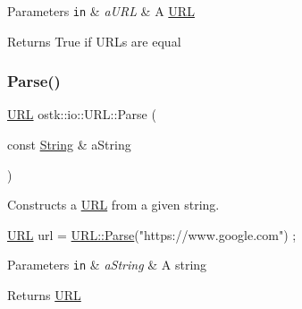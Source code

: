 \begin{DoxyParams}[1]{Parameters}
\mbox{\tt in}  & {\em a\+U\+RL} & A \hyperlink{classostk_1_1io_1_1_u_r_l}{U\+RL} \\
\hline
\end{DoxyParams}
\begin{DoxyReturn}{Returns}
True if U\+R\+Ls are equal 
\end{DoxyReturn}
\mbox{\label{classostk_1_1io_1_1_u_r_l_a1cd7216bb1079f62386a218ba510958d}} 
\subsubsection{\texorpdfstring{Parse()}{Parse()}}
{\footnotesize\ttfamily \hyperlink{classostk_1_1io_1_1_u_r_l}{U\+RL} ostk\+::io\+::\+U\+R\+L\+::\+Parse (\begin{DoxyParamCaption}\item[{const \hyperlink{namespaceostk_1_1io_a95d49b120613a7610cb1b4f03b1116b6}{String} \&}]{a\+String }\end{DoxyParamCaption})\hspace{0.3cm}{\ttfamily [static]}}



Constructs a \hyperlink{classostk_1_1io_1_1_u_r_l}{U\+RL} from a given string. 


\begin{DoxyCode}
\hyperlink{classostk_1_1io_1_1_u_r_l_a2537e046cef4ac966cc295abb81279c2}{URL} url = \hyperlink{classostk_1_1io_1_1_u_r_l_a1cd7216bb1079f62386a218ba510958d}{URL::Parse}(\textcolor{stringliteral}{"https://www.google.com"}) ;
\end{DoxyCode}



\begin{DoxyParams}[1]{Parameters}
\mbox{\tt in}  & {\em a\+String} & A string \\
\hline
\end{DoxyParams}
\begin{DoxyReturn}{Returns}
\hyperlink{classostk_1_1io_1_1_u_r_l}{U\+RL} 
\end{DoxyReturn}
\mbox{\label{classostk_1_1io_1_1_u_r_l_a3e646332fa91ee14876c15782967a960}} 
